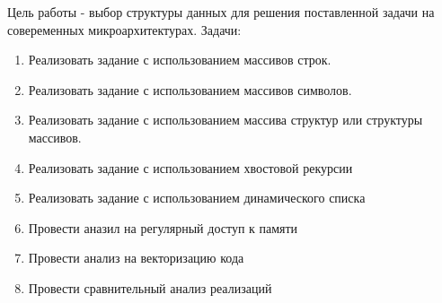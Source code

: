 Цель работы - выбор структуры данных для решения поставленной задачи на совеременных микроархитектурах. Задачи:
\begin{enumerate}
   \item Реализовать задание с использованием массивов строк.
   \item Реализовать задание с использованием массивов символов.
   \item Реализовать задание с использованием массива структур или структуры массивов.
   \item Реализовать задание с использованием хвостовой рекурсии
   \item Реализовать задание с использованием динамического списка
   \item Провести аназил на регулярный доступ к памяти
   \item Провести анализ на векторизацию кода
   \item Провести сравнительный анализ реализаций
\end{enumerate}

